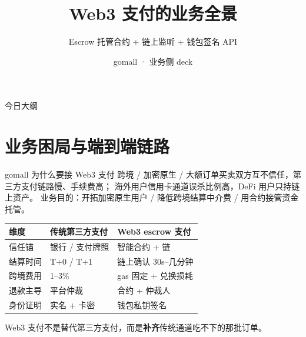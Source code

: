 

\title{Web3 支付的业务全景}
\subtitle{Escrow 托管合约 + 链上监听 + 钱包签名 API}
\author{gomall · 业务侧 deck}
\date{}



\maketitle

\begin{frame}{今日大纲}
\tableofcontents
\end{frame}

\section{业务困局与端到端链路}

\begin{frame}{gomall 为什么要接 Web3 支付}
\small 跨境 / 加密原生 / 大额订单买卖双方互不信任，第三方支付链路慢、手续费高；
海外用户信用卡通道误杀比例高，DeFi 用户只持链上资产。
业务目的：开拓加密原生用户 / 降低跨境结算中介费 / 用合约接管资金托管。
\vspace{2mm}
\begin{tabular}{@{}lll@{}}
\toprule
维度 & 传统第三方支付 & Web3 escrow 支付 \\
\midrule
信任锚    & 银行 / 支付牌照 & 智能合约 + 链 \\
结算时间  & T+0 / T+1       & 链上确认 30s--几分钟 \\
跨境费用  & 1--3\%          & gas 固定 + 兑换损耗 \\
退款主导  & 平台仲裁         & 合约 + 仲裁人 \\
身份证明  & 实名 + 卡密      & 钱包私钥签名 \\
\bottomrule
\end{tabular}
\vspace{2mm}
\small Web3 支付不是替代第三方支付，而是\textbf{补齐}传统通道吃不下的那批订单。
\end{frame}

